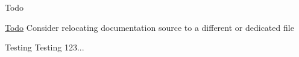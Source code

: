 \begin{DoxyRefDesc}{Todo}
\item[\hyperlink{todo__todo000003}{Todo}]Consider relocating documentation source to a different or dedicated file\end{DoxyRefDesc}


Testing Testing 123... 